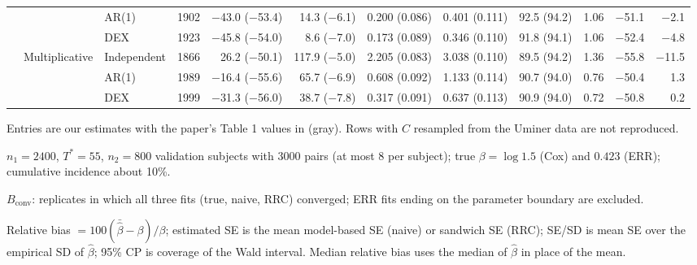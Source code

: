 \documentclass[10pt]{article}
\begin{document}
\begin{table}[ht]
\begin{threeparttable}
\begin{tabular}{lll r rr rr r r rr}
 &  & AR(1) & 1902 & $-$43.0 {\color{gray}($-$53.4)} & 14.3 {\color{gray}($-$6.1)} & 0.200 {\color{gray}(0.086)} & 0.401 {\color{gray}(0.111)} & 92.5 {\color{gray}(94.2)} & 1.06 & $-$51.1 & $-$2.1 \\
 &  & DEX & 1923 & $-$45.8 {\color{gray}($-$54.0)} & 8.6 {\color{gray}($-$7.0)} & 0.173 {\color{gray}(0.089)} & 0.346 {\color{gray}(0.110)} & 91.8 {\color{gray}(94.1)} & 1.06 & $-$52.4 & $-$4.8 \\
\cmidrule(l){2-12}
 & \multirow{3}{*}{Multiplicative} & Independent & 1866 & 26.2 {\color{gray}($-$50.1)} & 117.9 {\color{gray}($-$5.0)} & 2.205 {\color{gray}(0.083)} & 3.038 {\color{gray}(0.110)} & 89.5 {\color{gray}(94.2)} & 1.36 & $-$55.8 & $-$11.5 \\
 &  & AR(1) & 1989 & $-$16.4 {\color{gray}($-$55.6)} & 65.7 {\color{gray}($-$6.9)} & 0.608 {\color{gray}(0.092)} & 1.133 {\color{gray}(0.114)} & 90.7 {\color{gray}(94.0)} & 0.76 & $-$50.4 & 1.3 \\
 &  & DEX & 1999 & $-$31.3 {\color{gray}($-$56.0)} & 38.7 {\color{gray}($-$7.8)} & 0.317 {\color{gray}(0.091)} & 0.637 {\color{gray}(0.113)} & 90.9 {\color{gray}(94.0)} & 0.72 & $-$50.8 & 0.2 \\
\bottomrule
\end{tabular}
\begin{tablenotes}\footnotesize
\item Entries are our estimates with the paper's Table 1 values in {\color{gray}(gray)}. Rows with $C$ resampled from the Uminer data are not reproduced.
\item $n_1 = 2400$, $T^* = 55$, $n_2 = 800$ validation subjects with 3000 pairs (at most 8 per subject); true $\beta = \log 1.5$ (Cox) and $0.423$ (ERR); cumulative incidence about 10\%.
\item $B_{\mathrm{conv}}$: replicates in which all three fits (true, naive, RRC) converged; ERR fits ending on the parameter boundary are excluded.
\item Relative bias $= 100(\bar{\hat\beta} - \beta)/\beta$; estimated SE is the mean model-based SE (naive) or sandwich SE (RRC); SE/SD is mean SE over the empirical SD of $\hat\beta$; 95\% CP is coverage of the Wald interval. Median relative bias uses the median of $\hat\beta$ in place of the mean.
\end{tablenotes}
\end{threeparttable}
\end{table}
\end{document}
